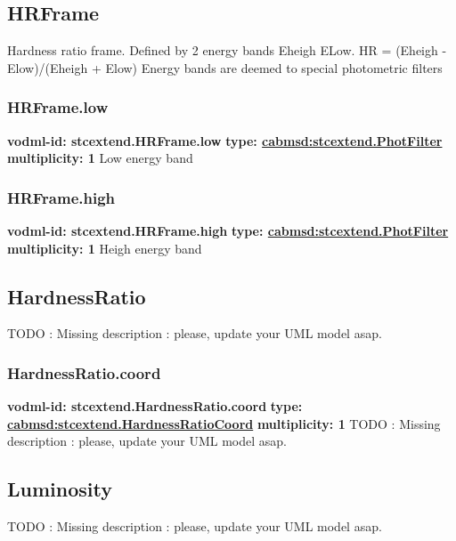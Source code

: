   \subsection{HRFrame}
  \label{sect:stcextend.HRFrame}
    Hardness ratio frame. Defined by 2 energy bands Eheigh ELow. HR = (Eheigh - Elow)/(Eheigh + Elow) Energy bands are deemed to special photometric filters

    \subsubsection{HRFrame.low}
      \textbf{vodml-id: stcextend.HRFrame.low} \newline
      \textbf{type: \hyperref[sect:stcextend.PhotFilter]{cabmsd:stcextend.PhotFilter}} \newline
      \textbf{multiplicity: 1} \newline 
      Low energy band

    \subsubsection{HRFrame.high}
      \textbf{vodml-id: stcextend.HRFrame.high} \newline
      \textbf{type: \hyperref[sect:stcextend.PhotFilter]{cabmsd:stcextend.PhotFilter}} \newline
      \textbf{multiplicity: 1} \newline 
      Heigh energy band

  \subsection{HardnessRatio}
  \label{sect:stcextend.HardnessRatio}
    TODO : Missing description : please, update your UML model asap.

    \subsubsection{HardnessRatio.coord}
      \textbf{vodml-id: stcextend.HardnessRatio.coord} \newline
      \textbf{type: \hyperref[sect:stcextend.HardnessRatioCoord]{cabmsd:stcextend.HardnessRatioCoord}} \newline
      \textbf{multiplicity: 1} \newline 
      TODO : Missing description : please, update your UML model asap.

  \subsection{Luminosity}
  \label{sect:stcextend.Luminosity}
    TODO : Missing description : please, update your UML model asap.

